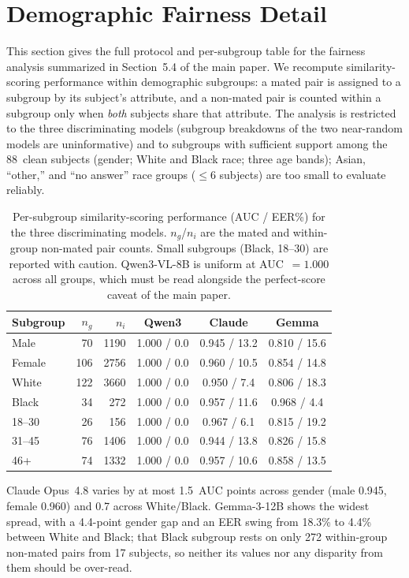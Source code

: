 \documentclass[runningheads]{llncs}
\begin{document}
\section{Demographic Fairness Detail}

This section gives the full protocol and per-subgroup table for the fairness
analysis summarized in Section~5.4 of the main paper. We recompute
similarity-scoring performance within demographic subgroups: a mated pair is
assigned to a subgroup by its subject's attribute, and a non-mated pair is
counted within a subgroup only when \emph{both} subjects share that attribute.
The analysis is restricted to the three discriminating models (subgroup
breakdowns of the two near-random models are uninformative) and to subgroups
with sufficient support among the 88~clean subjects (gender; White and Black
race; three age bands); Asian, ``other,'' and ``no answer'' race groups
($\leq 6$ subjects) are too small to evaluate reliably.

\begin{table}[htbp]
\centering
\caption{Per-subgroup similarity-scoring performance (AUC / EER\%) for the
  three discriminating models. $n_g$/$n_i$ are the mated and within-group
  non-mated pair counts. Small subgroups (Black, 18--30) are reported with
  caution. Qwen3-VL-8B is uniform at AUC~$= 1.000$ across all groups, which
  must be read alongside the perfect-score caveat of the main paper.}
\label{tab:supp_fairness}
\renewcommand{\arraystretch}{1.2}
\setlength{\tabcolsep}{5pt}
\begin{tabular}{l rr ccc}
\toprule
\textbf{Subgroup} & \textbf{$n_g$} & \textbf{$n_i$}
  & \textbf{Qwen3} & \textbf{Claude} & \textbf{Gemma} \\
\midrule
Male    &  70 & 1190 & 1.000 / 0.0 & 0.945 / 13.2 & 0.810 / 15.6 \\
Female  & 106 & 2756 & 1.000 / 0.0 & 0.960 / 10.5 & 0.854 / 14.8 \\
\midrule
White   & 122 & 3660 & 1.000 / 0.0 & 0.950 /  7.4 & 0.806 / 18.3 \\
Black   &  34 &  272 & 1.000 / 0.0 & 0.957 / 11.6 & 0.968 /  4.4 \\
\midrule
18--30  &  26 &  156 & 1.000 / 0.0 & 0.967 /  6.1 & 0.815 / 19.2 \\
31--45  &  76 & 1406 & 1.000 / 0.0 & 0.944 / 13.8 & 0.826 / 15.8 \\
46+     &  74 & 1332 & 1.000 / 0.0 & 0.957 / 10.6 & 0.858 / 13.5 \\
\bottomrule
\end{tabular}
\end{table}

Claude Opus~4.8 varies by at most 1.5~AUC points across gender (male 0.945,
female 0.960) and 0.7 across White/Black. Gemma-3-12B shows the widest spread,
with a 4.4-point gender gap and an EER swing from 18.3\% to 4.4\% between White
and Black; that Black subgroup rests on only 272 within-group non-mated pairs
from 17 subjects, so neither its values nor any disparity from them should be
over-read.
\end{document}
